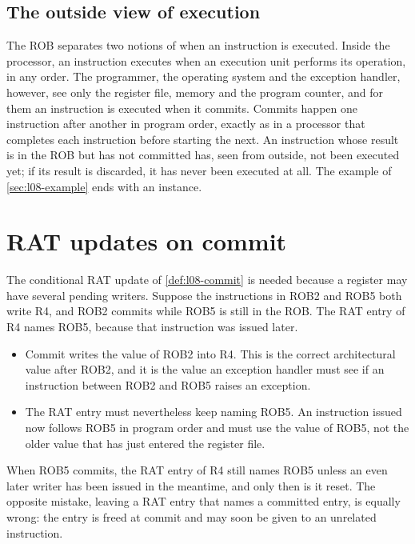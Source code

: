 \documentclass[../main.tex]{subfiles}
\begin{document}
\subsection{The outside view of execution}
\label{sec:l08-outside}

The ROB separates two notions of when an instruction is executed.  Inside the
processor, an instruction executes when an execution unit performs its
operation, in any order.  The programmer, the operating system and the
exception handler, however, see only the register file, memory and the
program counter, and for them an instruction is executed when it commits.
Commits happen one instruction after another in program order, exactly as in a
processor that completes each instruction before starting the next.  An
instruction whose result is in the ROB but has not committed has, seen from
outside, not been executed yet; if its result is discarded, it has never been
executed at all.  The example of \cref{sec:l08-example} ends with an
instance.

\section{RAT updates on commit}
\label{sec:l08-rat}

The conditional RAT update of \cref{def:l08-commit} is needed because a
register may have several pending writers.  Suppose the instructions in ROB2 and ROB5
both write R4, and ROB2 commits while ROB5 is still in the ROB.  The RAT entry
of R4 names ROB5, because that instruction was issued later.
\begin{itemize}
  \item Commit writes the value of ROB2 into R4.  This is the correct
    architectural value after ROB2, and it is the value an exception handler
    must see if an instruction between ROB2 and ROB5 raises an exception.
  \item The RAT entry must nevertheless keep naming ROB5.  An instruction
    issued now follows ROB5 in program order and must use the value of ROB5,
    not the older value that has just entered the register file.
\end{itemize}
When ROB5 commits, the RAT entry of R4 still names ROB5 unless an even later
writer has been issued in the meantime, and only then is it reset.  The
opposite mistake, leaving a RAT entry that names a committed entry, is equally
wrong: the entry is freed at commit and may soon be given to an unrelated
instruction.
\end{document}
